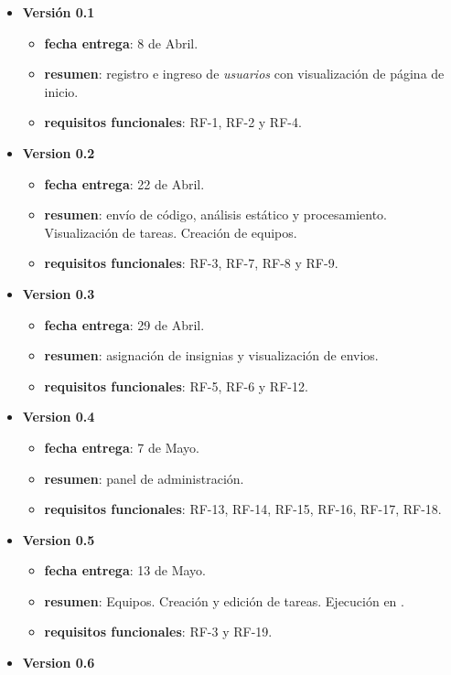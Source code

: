 \documentclass[11pt,spanish,listoffigures,listoftables]{tfgetsinf}
\begin{document}
\begin{itemize}
	\item \textbf{Versión 0.1}
	\begin{itemize}
		\item \textbf{fecha entrega}: 8 de Abril.
		\item \textbf{resumen}: registro e ingreso de \textit{usuarios} con visualización de página de inicio.
		\item \textbf{requisitos funcionales}: RF-1, RF-2 y RF-4.
	\end{itemize}
	\item \textbf{Version 0.2}
	\begin{itemize}
		\item \textbf{fecha entrega}: 22 de Abril.
		\item \textbf{resumen}: envío de código, análisis estático y procesamiento. Visualización de \gls{tarea}s. Creación de equipos.
		\item \textbf{requisitos funcionales}: RF-3, RF-7, RF-8 y RF-9.
	\end{itemize}
	\item \textbf{Version 0.3}
\begin{itemize}
	\item \textbf{fecha entrega}: 29 de Abril.
	\item \textbf{resumen}: asignación de \gls{insignia}s y visualización de \gls{envio}s.
	\item \textbf{requisitos funcionales}: RF-5, RF-6 y RF-12.
\end{itemize}
	\item \textbf{Version 0.4}
\begin{itemize}
	\item \textbf{fecha entrega}: 7 de Mayo.
	\item \textbf{resumen}: panel de administración.
    \item \textbf{requisitos funcionales}: RF-13, RF-14, RF-15, RF-16, RF-17, RF-18.
\end{itemize}
	\item \textbf{Version 0.5}
\begin{itemize}
	\item \textbf{fecha entrega}: 13 de Mayo.
	\item \textbf{resumen}: Equipos. Creación y edición de \gls{tarea}s. Ejecución en \kahan.
	\item \textbf{requisitos funcionales}: RF-3 y RF-19.
\end{itemize}
	\item \textbf{Version 0.6}

\end{itemize}
\end{document}
